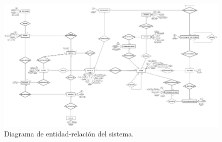 \documentclass[a4paper, 12pt,twoside]{report}  %
\numberwithin{equation}{subsection} %
\begin{document}
\begin{landscape}
	\begin{figure}[H]
		\centering
		\includegraphics[width=\textheight, angle=90]{Diagrama E-R.png}
		\caption{Diagrama de entidad-relación del sistema.}
		\label{diagrama_ER}
	\end{figure}
\end{landscape}
\end{document}
